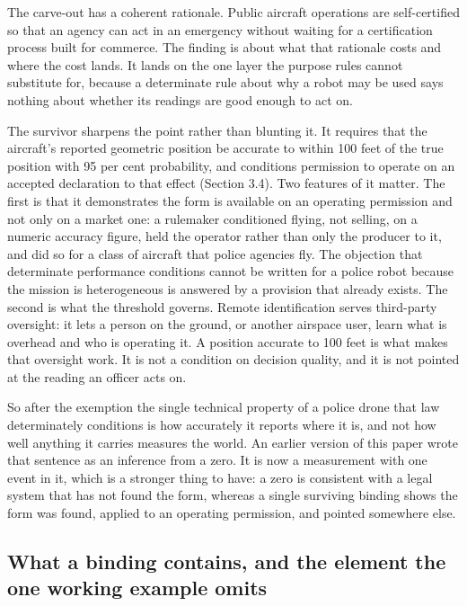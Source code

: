 The carve-out has a coherent rationale. Public aircraft operations are self-certified so that an agency can act in an emergency without waiting for a certification process built for commerce. The finding is about what that rationale costs and where the cost lands. It lands on the one layer the purpose rules cannot substitute for, because a determinate rule about why a robot may be used says nothing about whether its readings are good enough to act on.

The survivor sharpens the point rather than blunting it. It requires that the aircraft's reported geometric position be accurate to within 100 feet of the true position with 95 per cent probability, and conditions permission to operate on an accepted declaration to that effect (Section 3.4). Two features of it matter. The first is that it demonstrates the form is available on an operating permission and not only on a market one: a rulemaker conditioned flying, not selling, on a numeric accuracy figure, held the operator rather than only the producer to it, and did so for a class of aircraft that police agencies fly. The objection that determinate performance conditions cannot be written for a police robot because the mission is heterogeneous is answered by a provision that already exists. The second is what the threshold governs. Remote identification serves third-party oversight: it lets a person on the ground, or another airspace user, learn what is overhead and who is operating it. A position accurate to 100 feet is what makes that oversight work. It is not a condition on decision quality, and it is not pointed at the reading an officer acts on.

So after the exemption the single technical property of a police drone that law determinately conditions is how accurately it reports where it is, and not how well anything it carries measures the world. An earlier version of this paper wrote that sentence as an inference from a zero. It is now a measurement with one event in it, which is a stronger thing to have: a zero is consistent with a legal system that has not found the form, whereas a single surviving binding shows the form was found, applied to an operating permission, and pointed somewhere else.

\subsection{What a binding contains, and the element the one working example omits}\label{sec:4.4}

